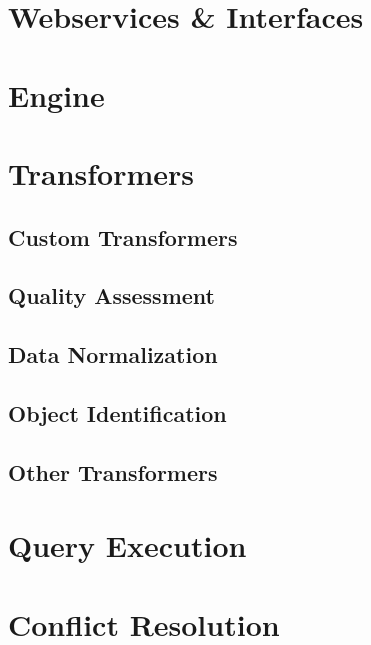 


\chapter{Webservices \& Interfaces}

\chapter{Engine}

\chapter{Transformers}

\section{Custom Transformers}
\section{Quality Assessment}
\section{Data Normalization}
\section{Object Identification}
\section{Other Transformers}

\chapter{Query Execution}

\chapter{Conflict Resolution}

